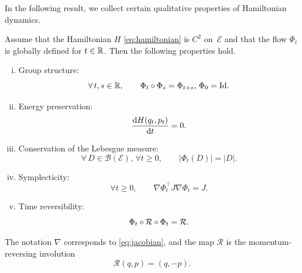     In the following result, we collect certain qualitative properties of Hamiltonian dynamics.
    \begin{prop}
        \label{prop:hamiltonian_properties}
        Assume that the Hamiltonian $H$ \eqref{eq:hamiltonian} is $C^2$ on~$\mathcal E$ and that the flow $\Phi_t$ is globally defined for $t\in\mathbb{R}$. Then the following properties hold.
        \begin{enumerate}[i)]
            \item Group structure: \[\forall\, t,s\in \mathbb{R},\qquad \Phi_t \circ \Phi_s = \Phi_{t+s},\, \Phi_0=\mathrm{Id}.\]
            \item Energy preservation: \[\frac{\mathrm{d}H(q_t,p_t)}{\mathrm{d}t}=0.\]
            \item Conservation of the Lebesgue measure: \[\forall \,D\in \mathcal B(\mathcal{E}),\,\forall t\geq 0,\qquad|\Phi_t(D)|=|D|.\]
            \item Symplecticity: \[\forall t\geq 0,\qquad\nabla \Phi_t^\intercal J \nabla \Phi_t = J.\]
            \item Time reversibility: \[\Phi_t \circ \mathcal{R} \circ \Phi_t=\mathcal R.\]
        \end{enumerate}
        The notation $\nabla$ corresponds to \eqref{eq:jacobian}, and the map $\mathcal R$ is the momentum-reversing involution
        \[\mathcal R(q,p)=(q,-p).\]
    \end{prop}
